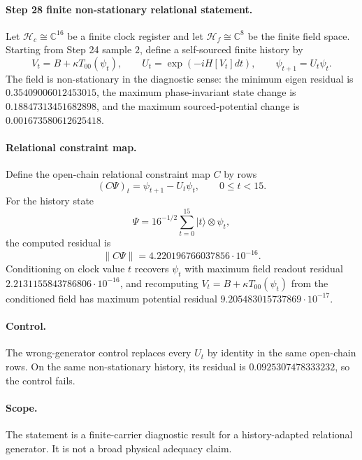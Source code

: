 \paragraph{Step 28 finite non-stationary relational statement.}
Let \(\mathcal{H}_c\cong\mathbb{C}^{16}\) be a finite clock register and
let \(\mathcal{H}_f\cong\mathbb{C}^{8}\) be the finite field space.  Starting
from Step 24 sample \(2\), define a self-sourced finite history by
\[
V_t = B+\kappa T_{00}(\psi_t),
\qquad
U_t=\exp(-iH[V_t]dt),
\qquad
\psi_{t+1}=U_t\psi_t.
\]
The field is non-stationary in the diagnostic sense: the minimum eigen
residual is \(0.35409006012453015\), the maximum phase-invariant state
change is \(0.18847313451682898\), and the maximum sourced-potential change
is \(0.001673580612625418\).

\paragraph{Relational constraint map.}
Define the open-chain relational constraint map \(C\) by rows
\[
(C\Psi)_t = \psi_{t+1}-U_t\psi_t,
\qquad 0\leq t<15.
\]
For the history state
\[
\Psi=16^{-1/2}\sum_{t=0}^{15}|t\rangle\otimes \psi_t,
\]
the computed residual is
\[
\|C\Psi\|=4.220196766037856\cdot 10^{-16}.
\]
Conditioning on clock value \(t\) recovers \(\psi_t\) with maximum field
readout residual \(2.2131155843786806\cdot 10^{-16}\), and recomputing
\(V_t=B+\kappa T_{00}(\psi_t)\) from the conditioned field has maximum
potential residual \(9.205483015737869\cdot 10^{-17}\).

\paragraph{Control.}
The wrong-generator control replaces every \(U_t\) by identity in the same
open-chain rows.  On the same non-stationary history, its residual is
\(0.0925307478333232\), so the control fails.

\paragraph{Scope.}
The statement is a finite-carrier diagnostic result for a history-adapted
relational generator.  It is not a broad physical adequacy claim.
